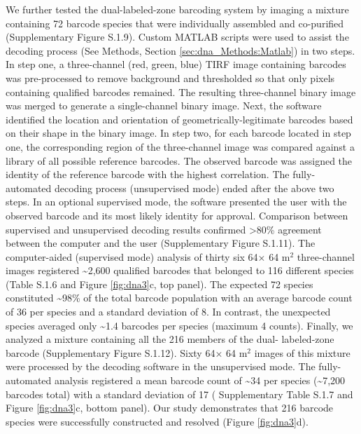 

We further tested the dual-labeled-zone barcoding system by imaging a mixture 
containing 72 barcode species that were individually assembled and co-purified (Supplementary Figure 
S.1.9). Custom MATLAB scripts were used to assist the decoding process (See Methods, Section \ref{sec:dna_Methods:Matlab}) in 
two steps. In step one, a three-channel (red, green, blue) TIRF image containing barcodes 
was pre-processed to remove background and thresholded so that only pixels containing 
qualified barcodes remained. The resulting three-channel binary image was merged to 
generate a single-channel binary image. Next, the software identified the location and 
orientation of geometrically-legitimate barcodes based on their shape in the binary image. 
In step two, for each barcode located in step one, the corresponding region of the three-channel image was compared against a library of all possible reference barcodes. The 
observed barcode was assigned the identity of the reference barcode with the highest 
correlation. The fully-automated decoding process (unsupervised mode) ended after the 
above two steps. In an optional supervised mode, the software presented the user with the 
observed barcode and its most likely identity for approval. Comparison between 
supervised and unsupervised decoding results confirmed >80\% agreement between the 
computer and the user (Supplementary Figure 
S.1.11). The computer-aided 
(supervised mode) analysis of thirty six 64× 64 
 \textmu m$^2$ three-channel images registered 
\textasciitilde2,600 qualified barcodes that belonged to 116 different species (Table S.1.6 and Figure \ref{fig:dna3}c, 
top panel). The expected 72 species constituted \textasciitilde98\% of the total barcode population 
with an average barcode count of 36 per species and a standard deviation of 8. In 
contrast, the unexpected species averaged only \textasciitilde1.4 barcodes per species (maximum 4 
counts). Finally, we analyzed a mixture containing all the 216 members of the dual- 
labeled-zone barcode (Supplementary Figure S.1.12). Sixty 64× 
64 
 \textmu m$^2$
images of this mixture were 
processed by the decoding software in the unsupervised mode. The fully-automated 
analysis registered a mean barcode count of \textasciitilde34 per species (\textasciitilde7,200 barcodes total) with 
a standard deviation of 17 ( Supplementary Table S.1.7 and Figure \ref{fig:dna3}c, bottom panel). Our study demonstrates that 216 
barcode species were successfully constructed and resolved (Figure \ref{fig:dna3}d). 


